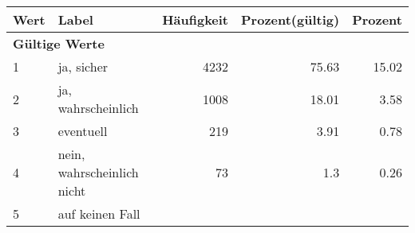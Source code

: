      \begin{longtable}{lXrrr}
     \toprule
     \textbf{Wert} & \textbf{Label} & \textbf{Häufigkeit} & \textbf{Prozent(gültig)} & \textbf{Prozent} \\
     \endhead
     \midrule
     \multicolumn{5}{l}{\textbf{Gültige Werte}}\\

     1 &
     \multicolumn{1}{X}{ ja, sicher   } &


       \num{4232} &
       \num[round-mode=places,round-precision=2]{75.63} &
         \num[round-mode=places,round-precision=2]{15.02} \\

     2 &
     \multicolumn{1}{X}{ ja, wahrscheinlich   } &


       \num{1008} &
       \num[round-mode=places,round-precision=2]{18.01} &
         \num[round-mode=places,round-precision=2]{3.58} \\

     3 &
     \multicolumn{1}{X}{ eventuell   } &


       \num{219} &
       \num[round-mode=places,round-precision=2]{3.91} &
         \num[round-mode=places,round-precision=2]{0.78} \\

     4 &
     \multicolumn{1}{X}{ nein, wahrscheinlich nicht   } &


       \num{73} &
       \num[round-mode=places,round-precision=2]{1.3} &
         \num[round-mode=places,round-precision=2]{0.26} \\

     5 &
     \multicolumn{1}{X}{ auf keinen Fall   } &



\end{longtable}
